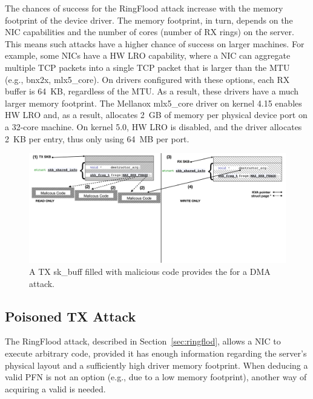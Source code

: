 The chances of success for the RingFlood attack increase with the memory footprint of the device driver. The memory footprint, in turn, depends on the NIC capabilities and the number of cores (number of RX rings) on the server. This means such attacks have a higher chance of success on larger machines. 
For example, some NICs have a HW LRO capability\cite{mlx5_lro}, where a NIC can aggregate multiple TCP packets into a single TCP packet that is larger than the MTU (e.g., bnx2x, mlx5\_core). On drivers configured with these options, each RX buffer is 64~KB, regardless of the MTU. As a result, these drivers have a much larger memory footprint. The Mellanox mlx5\_core driver on kernel 4.15 enables HW LRO and, as a result, allocates 2~GB of memory per physical device port on a 32-core machine. On kernel 5.0, HW LRO is disabled, and the driver allocates 2~KB per entry, thus only using 64~MB per port.

\begin{figure}[t]
    \centering
    \includegraphics[width=0.8\linewidth]{figs/accomplice.pdf}
    \caption{A TX sk\_buff filled with malicious code provides the \kva for a DMA attack.}
    \label{fig:payload}
\end{figure}
\subsection{Poisoned TX \Compound{} Attack}\label{sec:posion}

The RingFlood attack, described in Section~\ref{sec:ringflod}, allows a NIC to execute arbitrary code, provided it has enough information regarding the server's physical layout and a sufficiently high driver memory footprint. When deducing a valid PFN is not an option (e.g., due to a low memory footprint), another way of acquiring a valid \kva{} is needed.

